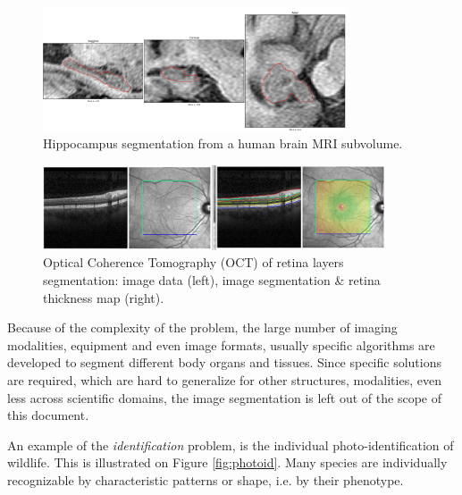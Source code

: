 \begin{figure}[H]
\begin{center}
\includegraphics[width=0.8\textwidth]{fig/hippo}
\end{center}
\caption{Hippocampus segmentation from a human brain MRI subvolume.}
\label{fig:hippo}
\end{figure}


\begin{figure}[H]
\begin{center}
\includegraphics[width=0.9\textwidth]{fig/oct}
\end{center}
\caption{Optical Coherence Tomography (OCT) of retina layers segmentation: image data (left), image segmentation \& retina thickness map (right).}
\label{fig:oct}
\end{figure}

Because of the complexity of the problem, the large number of imaging modalities, equipment and even image formats, usually specific algorithms are developed to segment different body organs and tissues. Since specific solutions are required, which are hard to generalize for other structures, modalities, even less across scientific domains, the image segmentation is left out of the scope of this document.


An example of the {\em identification} problem, is the individual photo-identification of wildlife. This is illustrated on Figure \ref{fig:photoid}. Many species are individually recognizable by characteristic patterns or shape, i.e. by their phenotype.


